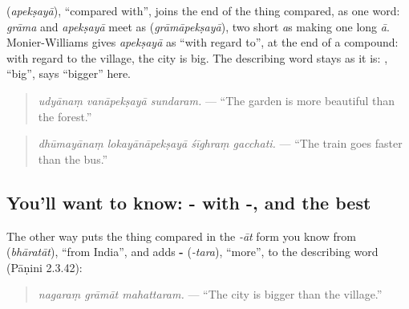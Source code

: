 \textbf{} (\emph{apekṣayā}), \textquotedblleft{}compared with\textquotedblright{}, joins the end of the thing compared, as one word: \emph{grāma} and \emph{apekṣayā} meet as \textbf{} (\emph{grāmāpekṣayā}), two short \emph{a}s making one long \emph{ā}. Monier-Williams gives \emph{apekṣayā} as \textquotedblleft{}with regard to\textquotedblright{}, at the end of a compound: with regard to the village, the city is big. The describing word stays as it is: \textbf{}, \textquotedblleft{}big\textquotedblright{}, says \textquotedblleft{}bigger\textquotedblright{} here.

\begin{quote}
\textbf{  }
\end{quote}

\begin{quote}
\emph{udyānaṃ vanāpekṣayā sundaram.} — \textquotedblleft{}The garden is more beautiful than the forest.\textquotedblright{}
\end{quote}

\begin{quote}
\textbf{   }
\end{quote}

\begin{quote}
\emph{dhūmayānaṃ lokayānāpekṣayā śīghraṃ gacchati.} — \textquotedblleft{}The train goes faster than the bus.\textquotedblright{}
\end{quote}

\subsection*{You'll want to know: - with -, and the best}
The other way puts the thing compared in the \emph{-āt} form you know from \textbf{} (\emph{bhāratāt}), \textquotedblleft{}from India\textquotedblright{}, and adds \textbf{-} (\emph{-tara}), \textquotedblleft{}more\textquotedblright{}, to the describing word (Pāṇini 2.3.42):

\begin{quote}
\textbf{  }
\end{quote}

\begin{quote}
\emph{nagaraṃ grāmāt mahattaram.} — \textquotedblleft{}The city is bigger than the village.\textquotedblright{}
\end{quote}

